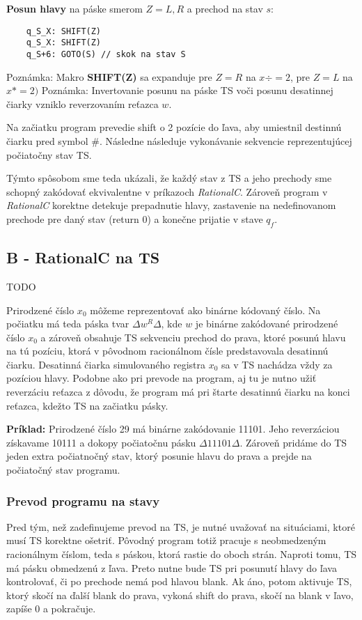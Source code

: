 \documentclass[10pt]{article}
\begin{document}
    \textbf{Posun hlavy} na páske smerom $Z = {L,R}$ a prechod na stav $s$:
    \begin{verbatim}
    q_S_X: SHIFT(Z) 
    q_S_X: SHIFT(Z)  
    q_S+6: GOTO(S) // skok na stav S
    \end{verbatim}
    Poznámka: Makro \textbf{SHIFT(Z)} sa expanduje pre $Z = R$ na $x \div = 2$, pre $Z = L$ na $x *= 2)$ 
    Poznámka: Invertovanie posunu na páske TS voči posunu desatinnej čiarky vzniklo reverzovaním reťazca $w$.

    Na začiatku program prevedie shift o 2 pozície do ľava, aby umiestnil destinnú čiarku pred
    symbol $\#$. Následne následuje vykonávanie sekvencie reprezentujúcej počiatočny stav TS.

    Týmto spôsobom sme teda ukázali, že každý stav z TS a jeho prechody sme schopný zakódovať
    ekvivalentne v príkazoch \textit{RationalC}. 
    Zároveň program v \textit{RationalC} korektne detekuje prepadnutie hlavy, zastavenie na
    nedefinovanom prechode pre daný stav (return 0) a konečne prijatie v stave $q_f$.


\subsection*{B - RationalC na TS}
TODO

Prirodzené číslo $x_0$ môžeme reprezentovať ako binárne kódovaný číslo. Na počiatku má teda páska
tvar $\Delta w^R \Delta$, kde $w$ je binárne zakódované prirodzené číslo $x_0$ a zároveň obsahuje TS sekvenciu
prechod do prava, ktoré posunú hlavu na tú pozíciu, ktorá v pôvodnom racionálnom čísle
predstavovala desatinnú čiarku. Desatinná čiarka simulovaného registra $x_0$ sa v TS nachádza vždy
za pozíciou hlavy.
Podobne ako pri prevode na program, aj tu je nutno užiť reverzáciu reťazca z dôvodu, že program má
pri štarte desatinnú čiarku na konci reťazca, kdežto TS na začiatku pásky.

\textbf{Príklad:}
Prirodzené číslo 29 má binárne zakódovanie 11101. Jeho reverzáciou získavame 10111 a dokopy
počiatočnu pásku $\Delta 11101 \Delta$. 
Zároveň pridáme do TS jeden extra počiatnočný stav, ktorý posunie hlavu do prava a prejde na
počiatočný stav programu.

\subsubsection*{Prevod programu na stavy}
Pred tým, než zadefinujeme prevod na TS, je nutné uvažovať na situáciami, ktoré musí TS korektne
ošetriť. Pôvodný program totiž pracuje s neobmedzeným racionálnym číslom, teda s páskou, ktorá
rastie do oboch strán. Naproti tomu, TS má pásku obmedzenú z ľava. Preto nutne bude TS pri posunutí
hlavy do ľava kontrolovať, či po prechode nemá pod hlavou blank. Ak áno, potom aktivuje TS, ktorý
skočí na ďalší blank do prava, vykoná shift do prava, skočí na blank v ľavo, zapíše 0 a pokračuje.
\end{document}
